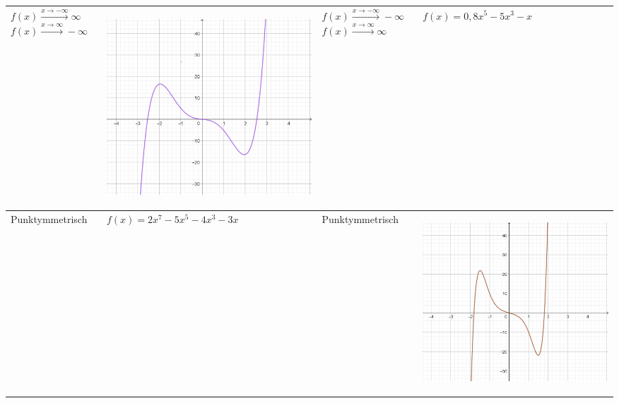 \documentclass[oneside,openany,headings=optiontotoc,11pt,numbers=noenddot]{scrreprt}
\begin{document}
\begin{table}
\begin{tabular}{|M{4.35cm}|M{4.35cm}||M{4.35cm}|M{4.35cm}|}
			\hline
			 & \begin{center}\includegraphics[scale=0.15]{04-GanzrationaleFunktionen/o1.jpg}\end{center} &  & \(f(x)=0,8x^5-5x^3-x\) \\
			\hline
			Punktymmetrisch & \(f(x)=2x^7-5x^5-4x^3-3x\)  
			&  Punktymmetrisch & \begin{center}\includegraphics[scale=0.15]{04-GanzrationaleFunktionen/p1.jpg}\end{center} \\
			\hline
		\end{tabular}
	\end{table}
\end{document}

